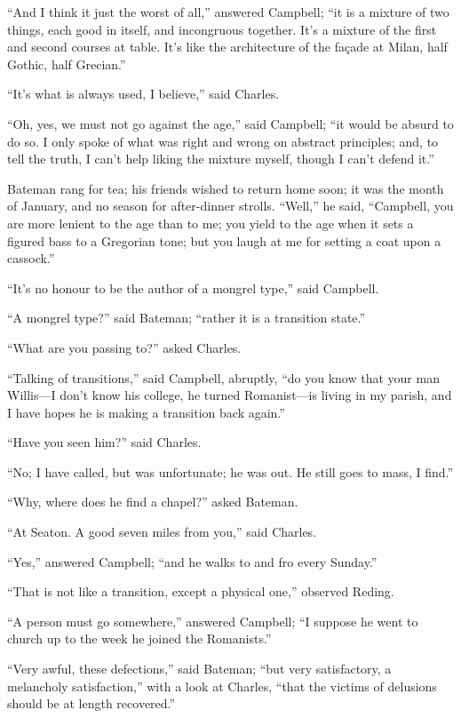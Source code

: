 ``And I think it just the worst of all,'' answered
Campbell; ``it is a mixture of two things, each good in itself,
and incongruous together. It's a mixture of the first and second
courses at table. It's like the architecture of the façade at Milan,
half Gothic, half Grecian.''

``It's what is always used, I believe,'' said Charles.

``Oh, yes, we must not go against the age,'' said Campbell;
``it would be absurd to do so. I only spoke of what was right and
wrong on abstract principles; and, to tell the truth, I can't help
liking the mixture myself, though I can't defend it.''

Bateman rang for tea; his friends wished to return home soon;
it was the month of January, and no season for after-dinner strolls.
``Well,'' he said, ``Campbell, you are more lenient to the
age than to me; you yield to the age when it sets a figured bass to a
Gregorian tone; but you laugh at me for setting a coat upon a
cassock.''

``It's no honour to be the author of a mongrel type,'' said
Campbell.

``A mongrel type?'' said Bateman; ``rather it is a
transition state.''

``What are you passing to?'' asked Charles.

``Talking of transitions,'' said Campbell, abruptly,
``do you know that your man Willis—I don't know his college, he
turned Romanist—is living in my parish, and I have hopes he is
making a transition back again.''

``Have you seen him?'' said Charles.

``No; I have called, but was unfortunate; he was out. He still
goes to mass, I find.''

``Why, where does he find a chapel?'' asked Bateman.

``At Seaton. A good seven miles from you,'' said Charles.

``Yes,'' answered Campbell; ``and he walks to and fro
every Sunday.''

``That is not like a transition, except a physical one,''
observed Reding.

``A person must go somewhere,'' answered Campbell; ``I
suppose he went to church up to the week he joined the
Romanists.''

``Very awful, these defections,'' said Bateman; ``but
very satisfactory, a melancholy satisfaction,'' with a look
at Charles, ``that the victims of delusions should be at length
recovered.''

